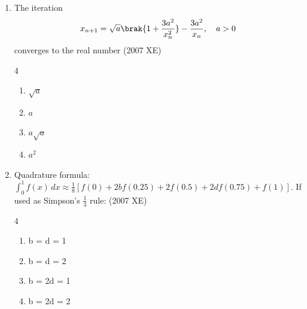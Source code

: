 \begin{enumerate}[label=\thesubsection.\arabic*,ref=\thesubsection.\theenumi]
    \hfill{(2007 XE)}
    \begin{multicols}{4}
    \begin{enumerate}
        \item 1.20
        \item 1.23
        \item 1.25
        \item 1.33
    \end{enumerate}
\end{multicols}
\item The iteration 
\begin{align*}
    x_{n+1} = \sqrt{a}\brak{1+\frac{3a^2}{x_n^2}} - \frac{3a^2}{x_n}, \quad a>0
\end{align*}
converges to the real number
    \hfill{(2007 XE)}
    \begin{multicols}{4}
\begin{enumerate}
    \item $\sqrt{a}$
    \item $a$
    \item $a\sqrt{a}$
    \item $a^2$
\end{enumerate}
\end{multicols}

    \item Quadrature formula: $\int_0^1 f(x) \, dx \approx \frac{1}{8} \left[ f(0) + 2b f(0.25) + 2 f(0.5) + 2d f(0.75) + f(1) \right]$. If used as Simpson’s $\frac{1}{3}$ rule:
    \hfill{(2007 XE)}
    \begin{multicols}{4}
    \begin{enumerate}
        \item b = d = 1
        \item b = d = 2
        \item b = 2d = 1
        \item b = 2d = 2 
    \end{enumerate}
    \end{multicols}


\end{enumerate}
